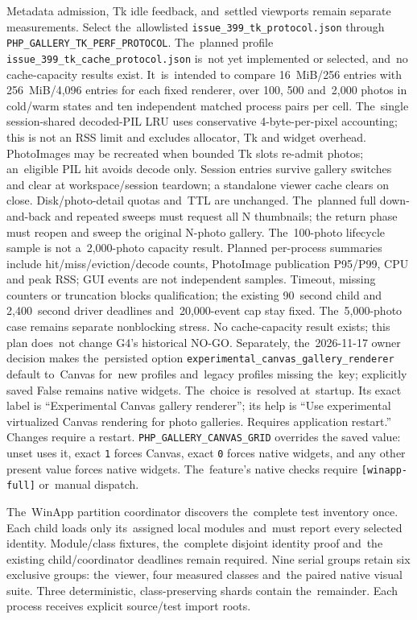 \documentclass[11pt,a4paper]{article}
\newcommand{\codeword}[1]{\nolinkurl{#1}}
\begin{document}
Metadata admission, Tk idle feedback, and~settled
viewports remain separate measurements. Select the~allowlisted
\codeword{issue_399_tk_protocol.json} through
\codeword{PHP_GALLERY_TK_PERF_PROTOCOL}. The~planned profile
\codeword{issue_399_tk_cache_protocol.json} is~not yet implemented or selected,
and~no cache-capacity results exist. It~is~intended to
compare 16~MiB/256 entries with 256~MiB/4,096 entries for each fixed renderer,
over 100, 500 and~2,000 photos in cold/warm states and ten independent matched
process pairs per cell. The~single session-shared decoded-PIL LRU uses
conservative 4-byte-per-pixel accounting; this is not an RSS limit and excludes
allocator, Tk and widget overhead. PhotoImages may be recreated when bounded Tk
slots re-admit photos; an~eligible PIL hit avoids decode only. Session entries
survive gallery switches and clear at workspace/session teardown; a standalone
viewer cache clears on close. Disk/photo-detail quotas and~TTL are unchanged.
The~planned full down-and-back and repeated sweeps must request all N thumbnails;
the return phase must reopen and sweep the original N-photo gallery. The~100-photo
lifecycle sample is not a~2,000-photo capacity result. Planned per-process
summaries include hit/miss/eviction/decode counts, PhotoImage publication
P95/P99, CPU and peak RSS; GUI events are not independent samples. Timeout,
missing counters or truncation blocks qualification; the existing 90~second child
and 2,400~second driver deadlines and~20,000-event cap stay fixed. The~5,000-photo
case remains separate nonblocking stress. No cache-capacity result exists; this plan does~not change G4's historical NO-GO. Separately, the~2026-11-17 owner decision makes the~persisted option
\codeword{experimental_canvas_gallery_renderer} default to~Canvas for~new
profiles and~legacy profiles missing the~key; explicitly saved False remains
native widgets. The~choice is~resolved at~startup. Its exact label is “Experimental
Canvas gallery renderer”; its help is “Use experimental virtualized Canvas
rendering for photo galleries. Requires application restart.” Changes require a
restart. \codeword{PHP_GALLERY_CANVAS_GRID} overrides the saved value: unset
uses it, exact \codeword{1} forces Canvas, exact \codeword{0} forces native
widgets, and any other present value forces native widgets. The~feature's native checks require
\codeword{[winapp-full]} or~manual dispatch.

The~WinApp partition coordinator discovers the~complete test inventory once.
Each child loads only its~assigned local modules and~must report every selected
identity. Module/class fixtures, the~complete disjoint identity proof and~the
existing child/coordinator deadlines remain required.
Nine serial groups retain six exclusive groups: the~viewer, four measured
classes and~the paired native visual suite. Three deterministic,
class-preserving shards contain the~remainder. Each process receives
explicit source/test import roots.
\end{document}
